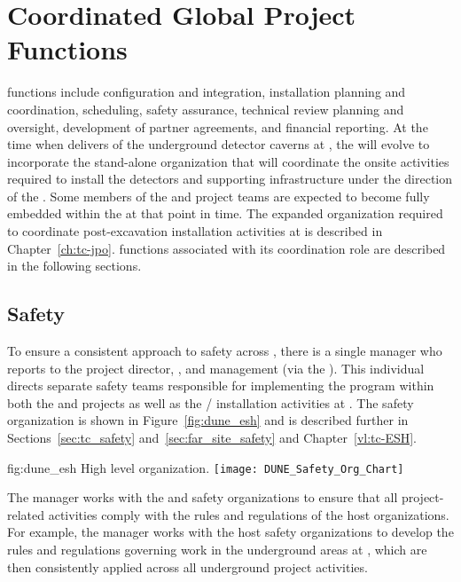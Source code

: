 \section{Coordinated Global Project Functions}
\label{sec:global_project}

 functions include  configuration and 
integration, installation planning and coordination, scheduling, 
safety assurance, technical review planning and oversight, development of partner agreements, and financial reporting.  At 
the time when   delivers
 of the underground detector caverns at 
, the  will evolve to incorporate the 
stand-alone organization that will coordinate the 
onsite activities required to install the detectors and 
supporting infrastructure under the direction of the .  
Some members of the  and  project 
teams are expected to become fully embedded within the 
 at that point in time.  The expanded  
organization required to coordinate post-excavation
installation activities at  is described in 
Chapter~\ref{ch:tc-jpo}.   functions associated with 
its  coordination role are described in the 
following sections.

\subsection{Safety}
\label{sec:dune_safety}

To ensure a consistent approach to safety across ,
there is a single   manager who reports to
the  project director, , and 
management (via the  ).  This individual
directs separate safety teams responsible for implementing the
  program within both the  and
 projects as well as the /
installation activities at . The safety organization is
shown in Figure~\ref{fig:dune_esh} and is described further in
Sections~\ref{sec:tc_safety} and~\ref{sec:far_site_safety} and
Chapter~\ref{vl:tc-ESH}.
\begin{dunefigure}{fig:dune_esh}
  {High level   organization.}
  \texttt{[image: DUNE\_Safety\_Org\_Chart]}
\end{dunefigure}
The   manager works with the  
and  safety organizations to ensure that all project-related 
activities comply with the rules and regulations of the host 
organizations.  For example, the   manager 
works with the host safety organizations to develop the 
rules and regulations governing work in the underground areas 
at , which are then consistently applied across all 
underground project activities.

